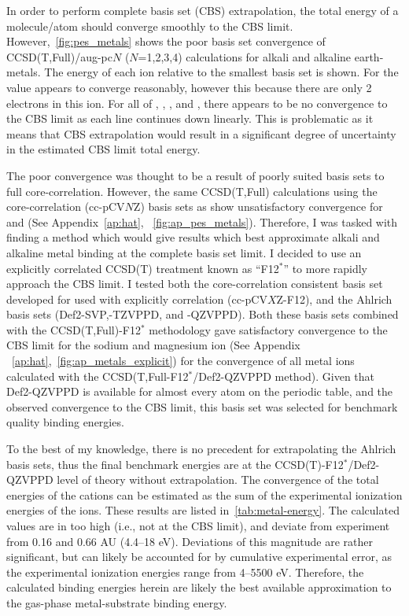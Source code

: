 In order to perform complete basis set (CBS) extrapolation, the total energy of a molecule/atom should converge smoothly to the CBS limit.\cite{Truhlar1998} However,~\ref{fig:pes_metals} shows the poor basis set convergence of CCSD(T,Full)/aug-pc$N$ ($N$=1,2,3,4) calculations for alkali and alkaline earth-metals. The energy of each ion relative to the smallest basis set is shown. For  the value appears to converge reasonably, however this because there are only 2 electrons in this ion. For all of , , , and , there appears to be no convergence to the CBS limit as each line continues down linearly. This is problematic as it means that CBS extrapolation would result in a significant degree of uncertainty in the estimated CBS limit total energy.

The poor convergence was thought to be a result of poorly suited basis sets to full core-correlation. However, the same CCSD(T,Full) calculations using the core-correlation (cc-pCV$N$Z) basis sets as show unsatisfactory convergence for  and  (See Appendix~\ref{ap:hat}, ~\ref{fig:ap_pes_metals}). Therefore, I was tasked with finding a method which would give results which best approximate alkali and alkaline metal binding at the complete basis set limit. I decided to use an explicitly correlated CCSD(T) treatment known as ``F12$^*$'' to more rapidly approach the CBS limit.\cite{Tenno2012} I tested both the core-correlation consistent basis set developed for used with explicitly correlation (cc-pCV$X$Z-F12),\cite{Peterson2008} and the Ahlrich basis sets (Def2-SVP,-TZVPPD, and -QZVPPD).\cite{Rappoport2010} Both these basis sets combined with the CCSD(T,Full)-F12$^*$ methodology gave satisfactory convergence to the CBS limit for the sodium and magnesium ion (See Appendix ~\ref{ap:hat},~\ref{fig:ap_metals_explicit}) for the convergence of all metal ions calculated with the CCSD(T,Full-F12$^*$/Def2-QZVPPD method). Given that Def2-QZVPPD is available for almost every atom on the periodic table, and the observed convergence to the CBS limit, this basis set was selected for benchmark quality binding energies.

To the best of my knowledge, there is no precedent for extrapolating the Ahlrich basis sets, thus the final benchmark energies are at the CCSD(T)-F12$^*$/Def2-QZVPPD level of theory without extrapolation. The convergence of the total energies of the cations can be estimated as the sum of the experimental ionization energies of the ions. These results are listed in~\ref{tab:metal-energy}. The calculated values are in too high (i.e., not at the CBS limit), and deviate from experiment from 0.16 and 0.66 AU (4.4--18 eV). Deviations of this magnitude are rather significant, but can likely be accounted for by cumulative experimental error, as the experimental ionization energies range from 4--5500 eV. Therefore, the calculated binding energies herein are likely the best available approximation to the gas-phase metal-substrate binding energy.

